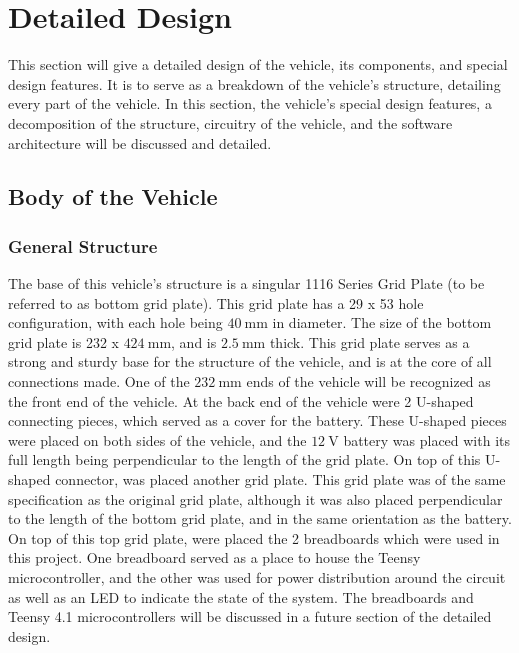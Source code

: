 \documentclass[11pt]{report}
\begin{document}
\chapter{Detailed Design}\label{ch:detailed-design}
This section will give a detailed design of the vehicle, its components, and special design features. It is to serve as a breakdown of the vehicle's structure, detailing every part of the vehicle. In this section, the vehicle's special design features, a decomposition of the structure, circuitry of the vehicle, and the software architecture will be discussed and detailed. 

\section{Body of the Vehicle}
\subsection{General Structure}
The base of this vehicle's structure is a singular 1116 Series Grid Plate (to be referred to as bottom grid plate). This grid plate has a  29 x 53 hole configuration, with each hole being $\SI{40}{\milli\meter}$ in diameter. The size of the bottom grid plate is 232 x $\SI{424}{\milli\meter}$, and is $\SI{2.5}{\milli\meter}$ thick. This grid plate serves as a strong and sturdy base for the structure of the vehicle, and is at the core of all connections made. One of the $\SI{232}{\milli\meter}$ ends of the vehicle will be recognized as the front end of the vehicle. At the back end of the vehicle were 2 U-shaped connecting pieces, which served as a cover for the battery. These U-shaped pieces were placed on both sides of the vehicle, and the $\SI{12}{\volt}$ battery was placed with its full length being perpendicular to the length of the grid plate. On top of this U-shaped connector, was placed another grid plate. This grid plate was of the same specification as the original grid plate, although it was also placed perpendicular to the length of the bottom grid plate, and in the same orientation as the battery. On top of this top grid plate, were placed the 2 breadboards which were used in this project. One breadboard served as a place to house the Teensy microcontroller, and the other was used for power distribution around the circuit as well as an \gls{LED} to indicate the state of the system. The breadboards and Teensy 4.1 microcontrollers will be discussed in a future section of the detailed design. 
\end{document}
